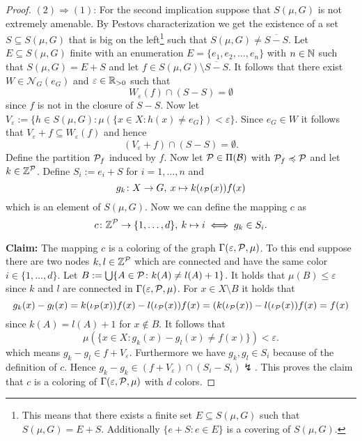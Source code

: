 \begin{proof}
  $(2) \Rightarrow (1)$: For the second implication suppose that $S(\mu, G)$ is not extremely amenable. By Pestovs characterization \cite[Theorem 3.4.9]{PestovDyn} we get the existence of a set $S \subseteq S(\mu, G)$ that is big on the left\footnote{This means that there exists a finite set $E \subseteq S(\mu, G)$ such that $S(\mu, G) = E + S.$ Additionally $\{e + S\colon e \in E\}$ is a covering of $S(\mu, G)$.} such that $S(\mu, G) \neq \overline{S - S}$. Let $E \subseteq S(\mu, G)$ finite with an enumeration $E = \{e_1, e_2, \ldots, e_n\}$ with $n \in \N$ such that $S(\mu, G) = E + S$ and let $f \in S(\mu, G) \setminus \overline{S - S}$. It follows that there exist $W \in \mathcal{N}_G(e_G)$ and $\varepsilon \in \R_{>0}$ such that
  \begin{equation*}
    W_\varepsilon(f) \cap (S - S) = \emptyset
  \end{equation*}
  since $f$ is not in the closure of $S - S$. 
  Now let $V_\varepsilon := \{h \in S(\mu, G)\colon \mu(\{x\in X\colon h(x) \neq e_G\}) < \varepsilon\}$. Since $e_G \in W$ it follows that $V_\varepsilon + f \subseteq W_\varepsilon(f)$ and hence
  \begin{equation*}
    (V_\varepsilon + f) \cap (S - S) = \emptyset.
  \end{equation*}
  Define the partition $\P_f$ induced by $f$.
  Now let $\P \in \Pi(\mathcal{B})$ with $\P_f \preccurlyeq \P$ and let $k \in \Z^\P$.
  Define $S_i := e_i + S$ for $i=1,\ldots,n$ and
  \begin{equation*}
    g_k\colon X \to G, \: x \mapsto k(\iota_\P(x))f(x)
  \end{equation*}
  which is an element of $S(\mu, G)$. Now we can define the mapping $c$ as
  \begin{equation*}
    c\colon \Z^\P \to \{1,\ldots, d\}, \: k \mapsto i \iff g_k \in S_i.
  \end{equation*}

  \textbf{Claim:} The mapping $c$ is a coloring of the graph $\Gamma(\varepsilon, \P, \mu)$. To this end suppose there are two nodes $k, l \in \Z^\P$ which are connected and have the same color $i \in \{1, \ldots, d\}$. Let $B := \bigcup\{A\in\P\colon k(A) \neq l(A) + 1\}$. It holds that $\mu(B) \leq \varepsilon$ since $k$ and $l$ are connected in $\Gamma(\varepsilon, \P, \mu)$. For $x \in X\setminus B$ it holds that
  \begin{equation*}
    g_k(x) - g_l(x) = k(\iota_\P(x))f(x) - l(\iota_\P(x))f(x) = (k(\iota_\P(x)) - l(\iota_\P(x)) f(x) = f(x)
  \end{equation*}
  since $k(A) = l(A) + 1$ for $x \notin B$. It follows that
  \begin{equation*}
    \mu(\{x\in X\colon g_k(x) - g_l(x) \neq f(x)\}) < \varepsilon.
  \end{equation*}
  which means $g_k - g_l \in f + V_\varepsilon$. Furthermore we have $g_k, g_l \in S_i$ because of the definition of $c$. Hence $g_k - g_k \in (f + V_\varepsilon) \cap (S_i - S_i) \lightning$.
  This proves the claim that $c$ is a coloring of $\Gamma(\varepsilon,\P,\mu)$ with $d$ colors.
\end{proof}
